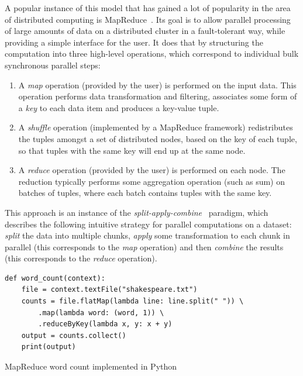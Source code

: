 A popular instance of this model that has gained a lot of popularity in the area of distributed
computing is MapReduce~\cite{mapreduce}. Its goal is to allow parallel processing of large
amounts of data on a distributed cluster in a fault-tolerant way, while providing a simple
interface for the user. It does that by structuring the computation into three high-level
operations, which correspond to individual bulk synchronous parallel steps:
\begin{enumerate}
	\item A \emph{map} operation (provided by the user) is performed on the input data. This
	      operation performs data transformation and filtering, associates some form of a
	      \emph{key} to each data item and produces a key-value tuple.
	\item A \emph{shuffle} operation (implemented by a MapReduce framework) redistributes the tuples
	      amongst a set of distributed nodes, based on the key of each tuple, so that tuples with the same
	      key will end up at the same node.
	\item A \emph{reduce} operation (provided by the user) is performed on each node. The reduction
	      typically performs some aggregation operation (such as sum) on batches of tuples, where each batch
	      contains tuples with the same key.
\end{enumerate}

This approach is an instance of the \emph{split-apply-combine}~\cite{split_apply_combine} paradigm, which
describes the following intuitive strategy for parallel computations on a dataset:
\emph{split} the data into multiple chunks, \emph{apply} some transformation
to each chunk in parallel (this corresponds to the \emph{map} operation) and then
\emph{combine} the results (this corresponds to the \emph{reduce} operation).

\begin{listing}
	\begin{verbatim}
def word_count(context):
	file = context.textFile("shakespeare.txt")
	counts = file.flatMap(lambda line: line.split(" ")) \
		.map(lambda word: (word, 1)) \
		.reduceByKey(lambda x, y: x + y)
	output = counts.collect()
	print(output)
	\end{verbatim}
	\caption{MapReduce word count implemented in Python}
	\label{lst:wordcount-example}
\end{listing}

